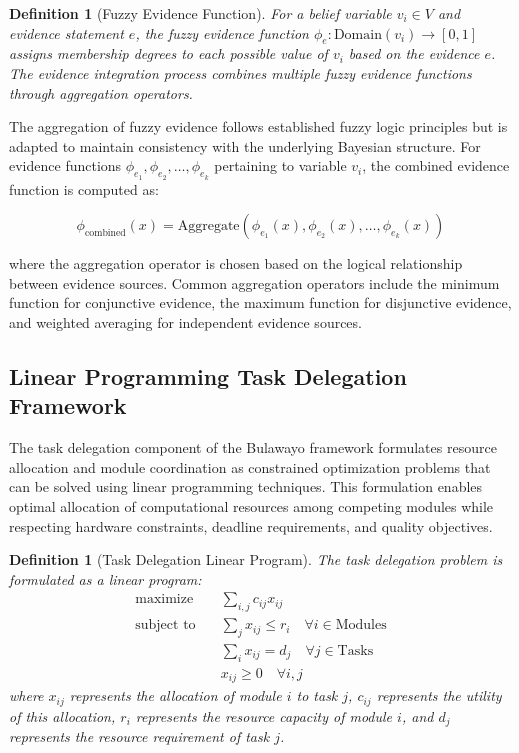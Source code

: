 \documentclass[12pt,a4paper]{article}
\newtheorem{definition}[theorem]{Definition}
\begin{document}
\begin{definition}[Fuzzy Evidence Function]
For a belief variable $v_i \in V$ and evidence statement $e$, the fuzzy evidence function $\phi_e : \text{Domain}(v_i) \rightarrow [0,1]$ assigns membership degrees to each possible value of $v_i$ based on the evidence $e$. The evidence integration process combines multiple fuzzy evidence functions through aggregation operators.
\end{definition}

The aggregation of fuzzy evidence follows established fuzzy logic principles but is adapted to maintain consistency with the underlying Bayesian structure. For evidence functions $\phi_{e_1}, \phi_{e_2}, \ldots, \phi_{e_k}$ pertaining to variable $v_i$, the combined evidence function is computed as:

\begin{equation}
\phi_{\text{combined}}(x) = \text{Aggregate}(\phi_{e_1}(x), \phi_{e_2}(x), \ldots, \phi_{e_k}(x))
\end{equation}

where the aggregation operator is chosen based on the logical relationship between evidence sources. Common aggregation operators include the minimum function for conjunctive evidence, the maximum function for disjunctive evidence, and weighted averaging for independent evidence sources.

\subsection{Linear Programming Task Delegation Framework}

The task delegation component of the Bulawayo framework formulates resource allocation and module coordination as constrained optimization problems that can be solved using linear programming techniques. This formulation enables optimal allocation of computational resources among competing modules while respecting hardware constraints, deadline requirements, and quality objectives.

\begin{definition}[Task Delegation Linear Program]
The task delegation problem is formulated as a linear program:
\begin{align}
\text{maximize} \quad &\sum_{i,j} c_{ij} x_{ij} \\
\text{subject to} \quad &\sum_{j} x_{ij} \leq r_i \quad \forall i \in \text{Modules} \\
&\sum_{i} x_{ij} = d_j \quad \forall j \in \text{Tasks} \\
&x_{ij} \geq 0 \quad \forall i,j
\end{align}
where $x_{ij}$ represents the allocation of module $i$ to task $j$, $c_{ij}$ represents the utility of this allocation, $r_i$ represents the resource capacity of module $i$, and $d_j$ represents the resource requirement of task $j$.
\end{definition}
\end{document}
